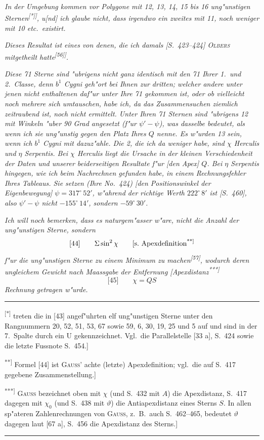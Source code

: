 \documentclass[12pt,a4paper]{article}
\theoremstyle{plain}
\theoremstyle{definition}
\theoremstyle{remark}
\begin{document}
\vspace{1em}
\noindent
{\itshape In der Umgebung kommen vor Polygone mit 12, 13, 14, 15 bis 16 ung"unstigen Sternen\textsuperscript{[*]]}, u[nd] ich glaube nicht, dass irgendwo ein zweites mit 11, noch weniger mit 10 etc.\ existirt.}

{\itshape Dieses Resultat ist eines von denen, die ich damals [S.\ 423--424] \textsc{Olbers} mitgetheilt hatte\textsuperscript{[56]]}.}

{\itshape Diese 71 Sterne sind "ubrigens nicht ganz identisch mit den 71 Ihrer 1.\ und 2.\ Classe, denn $b^1$ Cygni geh"ort bei Ihnen zur dritten; welcher andere unter jenen nicht enthaltenen daf"ur unter Ihre 71 gekommen ist, oder ob vielleicht noch mehrere sich umtauschen, habe ich, da das Zusammensuchen ziemlich zeitraubend ist, noch nicht ermittelt. Unter Ihren 71 Sternen sind "ubrigens 12 mit Winkeln "uber 90 Grad angesetzt (f"ur $\psi' - \psi$), was dasselbe bedeutet, als wenn ich sie ung"unstig gegen den Platz Ihres $Q$ nenne. Es w"urden 13 sein, wenn ich $b^1$ Cygni mit dazuz"ahle. Die 2, die ich da weniger habe, sind $\chi$ Herculis und $\eta$ Serpentis. Bei $\chi$ Herculis liegt die Ursache in der kleinen Verschiedenheit der Daten und unserer beiderseitigen Resultate f"ur [den Apex] $Q$. Bei $\eta$ Serpentis hingegen, wie ich beim Nachrechnen gefunden habe, in einem Rechnungsfehler Ihres Tableaus. Sie setzen (Ihre No.\ 424) [den Positionswinkel der Eigenbewegung] $\psi = 317^{\circ}\,52'$, w"ahrend der richtige Werth $222^{\circ}\,8'$ ist [S.\ 460], also $\psi' - \psi$ nicht $-155^{\circ}\,14'$, sondern $-59^{\circ}\,30'$.}

{\itshape Ich will noch bemerken, dass es naturgem"asser w"are, nicht die Anzahl der ung"unstigen Sterne, sondern}
\[
\text{[44]}\qquad \Sigma\sin^2\chi
\qquad\text{[s.\ Apexdefinition\textsuperscript{**]}}
\]
{\itshape f"ur die ung"unstigen Sterne zu einem Minimum zu machen\textsuperscript{[57]}, wodurch deren ungleichem Gewicht nach Maassgabe der Entfernung [Apexdistanz\textsuperscript{***]}}
\[
\text{[45]}\qquad \chi = QS
\]
{\itshape Rechnung getragen w"urde.}

\rule{\textwidth}{0.4pt}
{\small
\textsuperscript{[*]} treten die in [43] angef"uhrten elf ung"unstigen Sterne unter den Rangnummern 20, 52, 51, 53, 67 sowie 59, 6, 30, 19, 25 und 5 auf und sind in der 7.\ Spalte durch ein U gekennzeichnet. Vgl.\ die Parallelstelle [33 a], S.\ 424 sowie die letzte Fussnote S.\ 454.]

\textsuperscript{**]} Formel [44] ist \textsc{Gauss}' achte (letzte) Apexdefinition; vgl.\ die auf S.\ 417 gegebene Zusammenstellung.]

\textsuperscript{***]} \textsc{Gauss} bezeichnet oben mit $\chi$ (und S.\ 432 mit $A$) die Apexdistanz, S.\ 417 dagegen mit $\chi_0$ (und S.\ 438 mit $\vartheta$) die Antiapexdistanz eines Sterns $S$. In allen sp"ateren Zahlenrechnungen von \textsc{Gauss}, z.\ B.\ auch S.\ 462--465, bedeutet $\vartheta$ dagegen laut [67 a], S.\ 456 die Apexdistanz des Sterns.]
}
\rule{\textwidth}{0.4pt}
\end{document}
